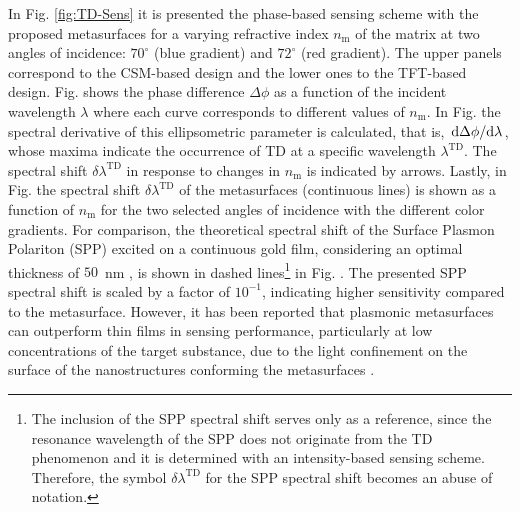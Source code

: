 In Fig. \ref{fig:TD-Sens} it is presented the phase-based sensing scheme with the proposed metasurfaces for a varying refractive index $n_\text{m}$ of the matrix at two angles of incidence: $70^\circ$ (blue gradient) and $72^\circ$ (red gradient). The upper panels correspond to the CSM-based design and the lower ones to the TFT-based design. Fig.   shows the phase difference $\Delta\phi$ as a function of the incident wavelength $\lambda$ where each curve corresponds to different values of $n_\text{m}$. In Fig.  the spectral derivative of this ellipsometric parameter is calculated, that is, $\dv*{\Delta\phi}{\lambda}$, whose maxima indicate the occurrence of TD at a specific wavelength $\lambda^\text{TD}$. The spectral shift $\delta\lambda^\text{TD}$ in response to changes in $n_\text{m}$ is indicated by arrows. Lastly, in Fig.  the spectral  shift $\delta\lambda^\text{TD}$ of the metasurfaces (continuous lines) is shown as a function of $n_\text{m}$ for the two selected angles of incidence with the different color gradients. For comparison, the theoretical spectral shift of the Surface Plasmon Polariton (SPP) excited on a continuous gold film, considering an optimal thickness of $50$~nm \cite{mohapatra_theoretical_2018}, is shown in dashed lines\footnote{The inclusion of the SPP spectral shift  serves only as a reference, since the resonance wavelength of the SPP does not originate from the TD phenomenon and it is determined with an intensity-based sensing scheme. Therefore, the symbol $\delta\lambda^\text{TD}$ for the SPP spectral shift becomes an abuse of notation.} in Fig. . The presented SPP spectral shift is scaled by a factor of $10^{-1}$,  indicating higher sensitivity compared to the metasurface. However, it has been reported that plasmonic metasurfaces can outperform thin films in sensing performance, particularly at low concentrations of the target substance, due to the light confinement on the surface of the nanostructures conforming the metasurfaces \cite{lopez_recent_2017}.


